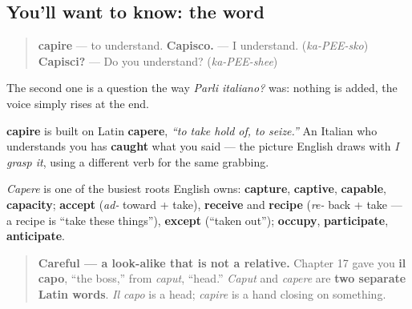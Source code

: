\subsection*{You'll want to know: the word}
\begin{quote}
\textbf{capire} — to understand. \textbf{Capisco.} — I understand. (\emph{ka-PEE-sko}) \textbf{Capisci?} — Do you understand? (\emph{ka-PEE-shee})
\end{quote}

The second one is a question the way \emph{Parli italiano?} was: nothing is added, the voice simply rises at the end.

\begin{cousinweb}
\textbf{capire} is built on Latin \textbf{capere}, \emph{\textquotedblleft{}to take hold of, to seize.\textquotedblright{}} An Italian who understands you has \textbf{caught} what you said — the picture English draws with \emph{I grasp it}, using a different verb for the same grabbing.

\emph{Capere} is one of the busiest roots English owns: \textbf{capture}, \textbf{captive}, \textbf{capable}, \textbf{capacity}; \textbf{accept} (\emph{ad-} toward + take), \textbf{receive} and \textbf{recipe} (\emph{re-} back + take — a recipe is \textquotedblleft{}take these things\textquotedblright{}), \textbf{except} (\textquotedblleft{}taken out\textquotedblright{}); \textbf{occupy}, \textbf{participate}, \textbf{anticipate}.

\begin{quote}
\textbf{Careful — a look-alike that is not a relative.} Chapter 17 gave you \textbf{il capo}, \textquotedblleft{}the boss,\textquotedblright{} from \emph{caput}, \textquotedblleft{}head.\textquotedblright{} \emph{Caput} and \emph{capere} are \textbf{two separate Latin words}. \emph{Il capo} is a head; \emph{capire} is a hand closing on something.
\end{quote}
\end{cousinweb}


